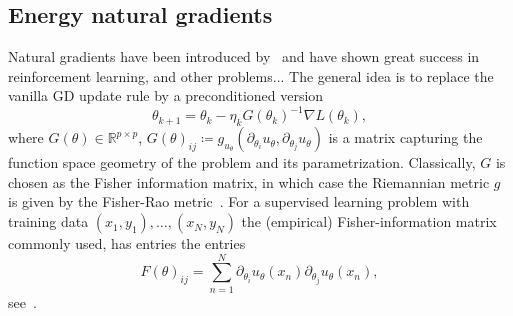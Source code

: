 \subsection{Energy natural gradients}


Natural gradients have been introduced by~\citet{amari1998natural} and have shown great success in reinforcement learning, and other problems...
The general idea is to replace the vanilla GD update rule by a preconditioned version
    \[ \theta_{k+1} = \theta_k - \eta_k G(\theta_k)^{-1} \nabla L(\theta_k), \]
where $G(\theta)\in\mathbb R^{p\times p}$, $G(\theta)_{ij} \coloneqq g_{u_\theta}(\partial_{\theta_i} u_\theta, \partial_{\theta_j} u_\theta)$ is a matrix capturing the function space geometry of the problem and its parametrization.
Classically, $G$ is chosen as the Fisher information matrix,
in which case the Riemannian metric $g$ is given by the Fisher-Rao metric~\cite[text]{keylist}.
For a supervised learning problem with training data $(x_1, y_1), \dots, (x_N, y_N)$ the (empirical) Fisher-information matrix commonly used, has entries the entries 
\begin{equation}
  F(\theta)_{ij} = \sum_{n=1}^N \partial_{\theta_i} u_\theta(x_n)\partial_{\theta_j} u_\theta(x_n),
\end{equation}
see~\cite{amari2000natural,martens2020new}. 

